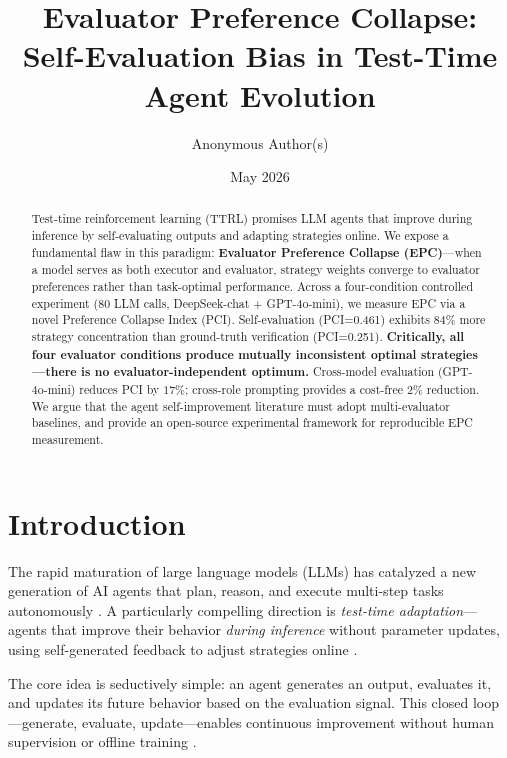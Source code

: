 \documentclass[11pt,a4paper]{article}
\title{\Large\textbf{Evaluator Preference Collapse: \\Self-Evaluation Bias in Test-Time Agent Evolution}}
\author{
Anonymous Author(s)
}
\date{May 2026}
\begin{document}
\maketitle

\begin{abstract}
Test-time reinforcement learning (TTRL) promises LLM agents that improve during inference by self-evaluating outputs and adapting strategies online. We expose a fundamental flaw in this paradigm: \textbf{Evaluator Preference Collapse (EPC)}---when a model serves as both executor and evaluator, strategy weights converge to evaluator preferences rather than task-optimal performance. Across a four-condition controlled experiment (80 LLM calls, DeepSeek-chat + GPT-4o-mini), we measure EPC via a novel Preference Collapse Index (PCI). Self-evaluation (PCI=0.461) exhibits $84\%$ more strategy concentration than ground-truth verification (PCI=0.251). \textbf{Critically, all four evaluator conditions produce mutually inconsistent optimal strategies---there is no evaluator-independent optimum.} Cross-model evaluation (GPT-4o-mini) reduces PCI by $17\%$; cross-role prompting provides a cost-free $2\%$ reduction. We argue that the agent self-improvement literature must adopt multi-evaluator baselines, and provide an open-source experimental framework for reproducible EPC measurement.
\end{abstract}

\section{Introduction}

The rapid maturation of large language models (LLMs) has catalyzed a new generation of AI agents that plan, reason, and execute multi-step tasks autonomously \cite{yao2023react, wu2023autogen, park2023generative}. A particularly compelling direction is \textit{test-time adaptation}---agents that improve their behavior \textit{during inference} without parameter updates, using self-generated feedback to adjust strategies online \cite{shinn2023reflexion, madaan2023selfrefine, sun2020testtime}.

The core idea is seductively simple: an agent generates an output, evaluates it, and updates its future behavior based on the evaluation signal. This closed loop---generate, evaluate, update---enables continuous improvement without human supervision or offline training \cite{yuan2024selfrewarding, chen2024spin, deepseek2024v3}.
\end{document}
